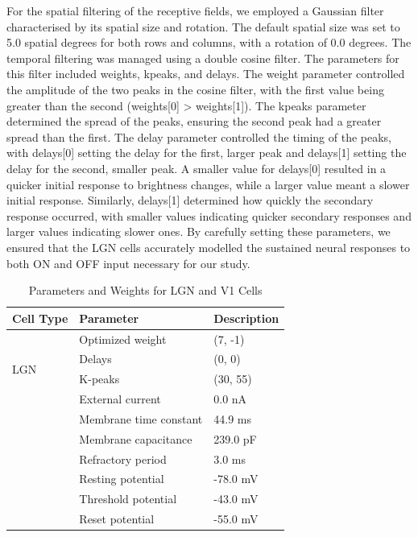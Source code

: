 \documentclass[12pt]{article}
\begin{document}
For the spatial filtering of the receptive fields, we employed a Gaussian filter characterised by its spatial size and rotation. The default spatial size was set to 5.0 spatial degrees for both rows and columns, with a rotation of 0.0 degrees. The temporal filtering was managed using a double cosine filter. The parameters for this filter included weights, kpeaks, and delays. The weight parameter controlled the amplitude of the two peaks in the cosine filter, with the first value being greater than the second (weights[0] > weights[1]). The kpeaks parameter determined the spread of the peaks, ensuring the second peak had a greater spread than the first.
\bigbreak
The delay parameter controlled the timing of the peaks, with delays[0] setting the delay for the first, larger peak and delays[1] setting the delay for the second, smaller peak. A smaller value for delays[0] resulted in a quicker initial response to brightness changes, while a larger value meant a slower initial response. Similarly, delays[1] determined how quickly the secondary response occurred, with smaller values indicating quicker secondary responses and larger values indicating slower ones. By carefully setting these parameters, we ensured that the LGN cells accurately modelled the sustained neural responses to both ON and OFF input necessary for our study.

\begin{table}[H]
  \centering
  \caption{Parameters and Weights for LGN and V1 Cells}
  \begin{tabular}{lll}
  \toprule
  \textbf{Cell Type} & \textbf{Parameter} & \textbf{Description} \\
  \midrule
  \multirow{4}{*}{LGN} 
      & Optimized weight      & (7, -1) \\
      & Delays   & (0, 0) \\
      & K-peaks   & (30, 55) \\
  \midrule
  \multirow{7}{*}{V1} 
      & External current         & 0.0 nA \\
      & Membrane time constant        & 44.9 ms \\
      & Membrane capacitance          & 239.0 pF \\
      & Refractory period       & 3.0 ms \\
      & Resting potential          & -78.0 mV \\
      & Threshold potential         & -43.0 mV \\
      & Reset potential      & -55.0 mV \\
  \bottomrule
  \end{tabular}
\end{table}
\end{document}
